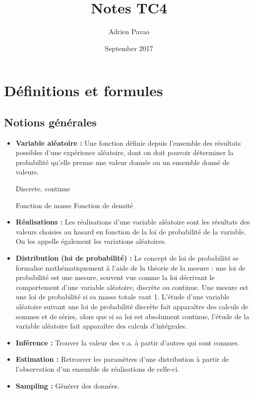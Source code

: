 \documentclass{article}
\title{Notes TC4}
\author{Adrien Pavao}
\date{September 2017}
\begin{document}
\maketitle

\tableofcontents

\section{Définitions et formules}

\subsection{Notions générales}

\begin{itemize}
\item \textbf{Variable aléatoire :} Une fonction définie depuis l'ensemble des résultats possibles d'une expérience aléatoire, dont on doit pouvoir déterminer la probabilité qu'elle prenne une valeur donnée ou un ensemble donné de valeurs. 

Discrete, continue

Fonction de masse
Fonction de densité

\item \textbf{Réalisations :} Les réalisations d'une variable aléatoire sont les résultats des valeurs choisies au hasard en fonction de la loi de probabilité de la variable. On les appelle également les variations aléatoires.

\item \textbf{Distribution (loi de probabilité) :} Le concept de loi de probabilité se formalise mathématiquement à l'aide de la théorie de la mesure : une loi de probabilité est une mesure, souvent vue comme la loi décrivant le comportement d'une variable aléatoire, discrète ou continue. Une mesure est une loi de probabilité si sa masse totale vaut 1. L'étude d'une variable aléatoire suivant une loi de probabilité discrète fait apparaître des calculs de sommes et de séries, alors que si sa loi est absolument continue, l'étude de la variable aléatoire fait apparaître des calculs d'intégrales.

\item \textbf{Inférence :} Trouver la valeur des v.a. à partir d'autres qui sont connues.

\item \textbf{Estimation :} Retrouver les paramètres d'une distribution à partir de l'observation d'un ensemble de réalisations de celle-ci.

\item \textbf{Sampling :} Générer des données.

\end{itemize}
\end{document}
